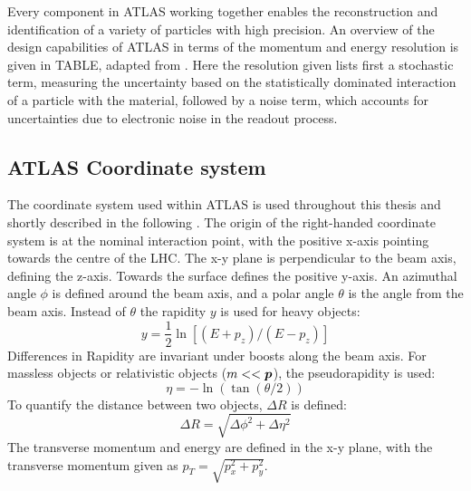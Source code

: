 Every component in \ac{ATLAS} working together enables the reconstruction and identification of a variety of particles with high precision. An overview of the design capabilities of \ac{ATLAS} in terms of the momentum and energy resolution is given in TABLE, adapted from .
Here the resolution given lists first a stochastic term, measuring the uncertainty based on the statistically dominated interaction of a particle with the material, followed by a noise term, which accounts for uncertainties due to electronic noise in the readout process. 



\subsection{ATLAS Coordinate system}
The coordinate system used within \ac{ATLAS} is used throughout this thesis and shortly described in the following \cite{AtlasExperiment}. 
The origin of the right-handed coordinate system is at the nominal interaction point, with the positive x-axis pointing towards the centre of the \ac{LHC}.  The x-y plane is perpendicular to the beam axis, defining the z-axis. Towards the surface defines the positive y-axis.
An azimuthal angle $\phi$ is defined around the beam axis, and a polar angle $\theta$ is the angle from the beam axis. Instead of $\theta$ the rapidity $y$ is used for heavy objects:
\begin{equation}
    y = \frac{1}{2} \ln[(E+p_z)/(E-p_z)]
\end{equation}
Differences in Rapidity are invariant under boosts along the beam axis.
For massless objects or relativistic objects ($m << \vb*{p}$),  the pseudorapidity is used: 
\begin{equation}
    \eta = -\ln(\tan(\theta/2)) 
\end{equation}
To quantify the distance between two objects,  $\Delta R$ is defined:
\begin{equation}
    \Delta R = \sqrt{\Delta\phi^2 + \Delta\eta^2} \label{eq:expsetup:deltaR}
\end{equation}
The transverse momentum and energy are defined in the x-y plane,  with the transverse momentum given as $p_T = \sqrt{p_x^2 +p_y^2}$.





